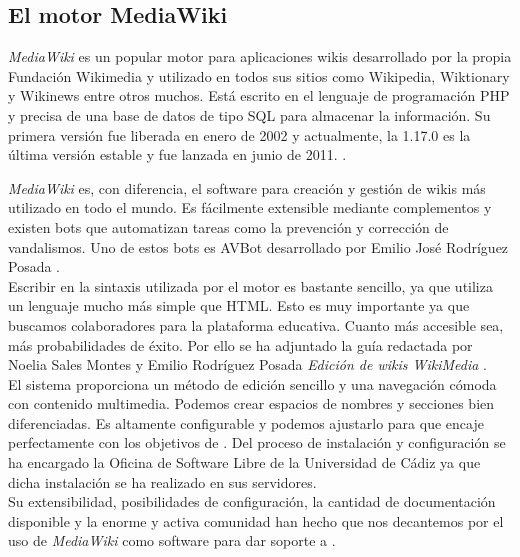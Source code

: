 \subsection{El motor MediaWiki}

\textit{MediaWiki} es un popular motor para aplicaciones wikis desarrollado
por la propia Fundación Wikimedia y utilizado en todos sus sitios como
Wikipedia, Wiktionary y Wikinews entre otros muchos. Está escrito en el
lenguaje de programación PHP y precisa de una base de datos de tipo SQL
para almacenar la información. Su primera versión fue liberada en enero
de 2002 y actualmente, la 1.17.0 es la última versión estable y fue lanzada
en junio de 2011. \cite{website:mediawiki}.\\


\textit{MediaWiki} es, con diferencia, el software para creación y gestión
de wikis más utilizado en todo el mundo. Es fácilmente extensible mediante
complementos y existen bots que automatizan tareas como la prevención
y corrección de vandalismos. Uno de estos bots es AVBot desarrollado
por Emilio José Rodríguez Posada \cite{website:avbot}.\\

Escribir en la sintaxis utilizada por el motor es bastante sencillo, ya que
utiliza un lenguaje mucho más simple que HTML. Esto es muy importante ya
que buscamos colaboradores para la plataforma educativa. Cuanto más accesible
sea, más probabilidades de éxito. Por ello se ha adjuntado la guía
redactada por Noelia Sales Montes y Emilio Rodríguez Posada \textit{Edición
de wikis WikiMedia} \cite{pdf:wikimedia}.\\

El sistema proporciona un método de edición sencillo y una navegación
cómoda con contenido multimedia. Podemos crear espacios de nombres y
secciones bien diferenciadas. Es altamente configurable y podemos ajustarlo
para que encaje perfectamente con los objetivos de \wiki. Del proceso de
instalación y configuración se ha encargado la Oficina de Software Libre
de la Universidad de Cádiz ya que dicha instalación se ha realizado en
sus servidores.\\

Su extensibilidad, posibilidades de configuración, la cantidad de documentación
disponible y la enorme y activa comunidad han hecho que nos decantemos
por el uso de \textit{MediaWiki} como software para dar soporte a \wiki.\\

